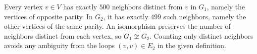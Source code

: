 \documentclass[11pt,oneside]{article}
\begin{document}
\begin{solution}[2]
Every vertex $v\in V$ has exactly $500$ neighbors distinct from $v$ in $G_1$, namely the vertices of opposite parity. In $G_2$, it has exactly $499$ such neighbors, namely the other vertices of the same parity. An isomorphism preserves the number of neighbors distinct from each vertex, so $G_1\not\cong G_2$. Counting only distinct neighbors avoids any ambiguity from the loops $(v,v)\in E_2$ in the given definition.
\end{solution}
\end{document}
